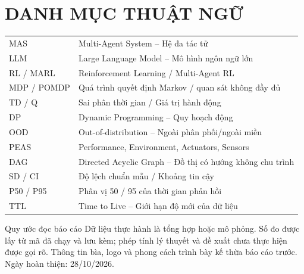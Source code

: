 \documentclass[12pt,a4paper]{article}
\begin{document}

\setcounter{tocdepth}{2}
{\linespread{1.0}\selectfont\tableofcontents}
\clearpage\listoffigures\clearpage
\section*{DANH MỤC THUẬT NGỮ}
\begin{tabularx}{\linewidth}{p{2.5cm}X}
\toprule
MAS & Multi-Agent System -- Hệ đa tác tử\\
LLM & Large Language Model -- Mô hình ngôn ngữ lớn\\
RL / MARL & Reinforcement Learning / Multi-Agent RL\\
MDP / POMDP & Quá trình quyết định Markov / quan sát không đầy đủ\\
TD / Q & Sai phân thời gian / Giá trị hành động\\
DP & Dynamic Programming -- Quy hoạch động\\
OOD & Out-of-distribution -- Ngoài phân phối/ngoài miền\\
PEAS & Performance, Environment, Actuators, Sensors\\
DAG & Directed Acyclic Graph -- Đồ thị có hướng không chu trình\\
SD / CI & Độ lệch chuẩn mẫu / Khoảng tin cậy\\
P50 / P95 & Phân vị 50 / 95 của thời gian phản hồi\\
TTL & Time to Live -- Giới hạn độ mới của dữ liệu\\
\bottomrule
\end{tabularx}
\vspace{8mm}
\begin{academicbox}{Quy ước đọc báo cáo}
Dữ liệu thực hành là tổng hợp hoặc mô phỏng. Số đo được lấy từ mã đã chạy và lưu kèm; phép tính lý thuyết và đề xuất chưa thực hiện được gọi rõ. Thông tin bìa, logo và phong cách trình bày kế thừa báo cáo trước. Ngày hoàn thiện: 28/10/2026.
\end{academicbox}
\clearpage{}\setcounter{page}{1}



\end{document}
